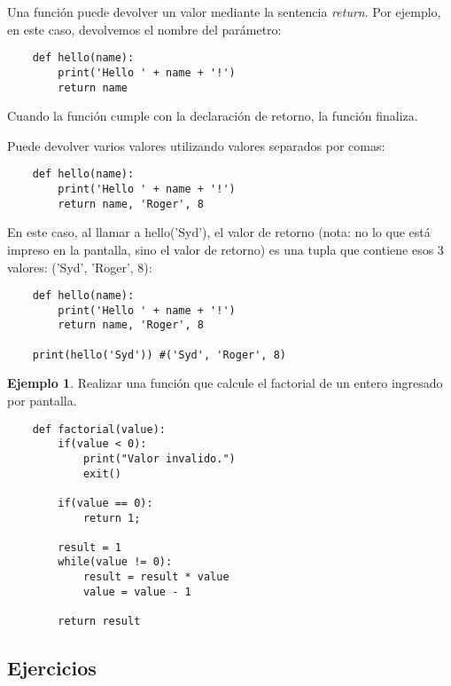 \documentclass[12pt]{article}
\theoremstyle{definition}
\newtheorem{example}{Ejemplo}[section]
\begin{document}
    Una función puede devolver un valor mediante la sentencia \textit{return}.
    Por ejemplo, en este caso, devolvemos el nombre del parámetro:
    \begin{lstlisting}
    def hello(name):
        print('Hello ' + name + '!')
        return name
    \end{lstlisting}
    Cuando la función cumple con la declaración de retorno, la función finaliza.

    Puede devolver varios valores utilizando valores separados por comas:
    \begin{lstlisting}
    def hello(name):
        print('Hello ' + name + '!')
        return name, 'Roger', 8
    \end{lstlisting}

    En este caso, al llamar a hello('Syd'), el valor de retorno (nota: no lo que está impreso en la pantalla,
    sino el valor de retorno) es una tupla que contiene esos 3 valores: ('Syd', 'Roger', 8):

    \begin{lstlisting}
    def hello(name):
        print('Hello ' + name + '!')
        return name, 'Roger', 8

    print(hello('Syd')) #('Syd', 'Roger', 8)
    \end{lstlisting}

    \begin{example}
        Realizar una función que calcule el factorial de un entero ingresado por pantalla.
    \end{example}

    \begin{lstlisting}
    def factorial(value):
        if(value < 0):
            print("Valor invalido.")
            exit()

        if(value == 0):
            return 1;

        result = 1
        while(value != 0):
            result = result * value
            value = value - 1

        return result
    \end{lstlisting}


    \subsection{Ejercicios}
\end{document}
